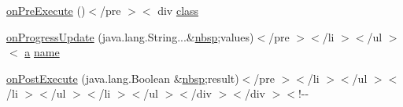 \begin{DoxyCompactItemize}
\item 
\hyperlink{_connection_8html_a8c8a33bf276865be3fcca9dc2a40b675}{on\-Pre\-Execute} ()$<$/pre $>$$<$ div \hyperlink{_tools_8html_acf06f836132665ba8114f5a414c2403f}{class}
\item 
\hyperlink{_connection_8html_a23d6a48196a09d36a9aa8d7183ec6a0e}{on\-Progress\-Update} (java.\-lang.\-String...\&\hyperlink{_tools_8html_aef915316f784c9063d942974538301a6}{nbsp};values)$<$/pre $>$$<$/li $>$$<$/ul $>$$<$ \hyperlink{style_8css_a5e8981582017bb8b84c21f148345d1f7}{a} \hyperlink{_cloudia_d_b_8html_ab74e6bf80237ddc4109968cedc58c151}{name}
\item 
\hyperlink{_connection_8html_a27daf1ac5db266a181702238c3a72ecc}{on\-Post\-Execute} (java.\-lang.\-Boolean \&\hyperlink{_tools_8html_aef915316f784c9063d942974538301a6}{nbsp};result)$<$/pre $>$$<$/li $>$$<$/ul $>$$<$/li $>$$<$/ul $>$$<$/li $>$$<$/ul $>$$<$/div $>$$<$/div $>$$<$!-\/-\/
\end{DoxyCompactItemize}
